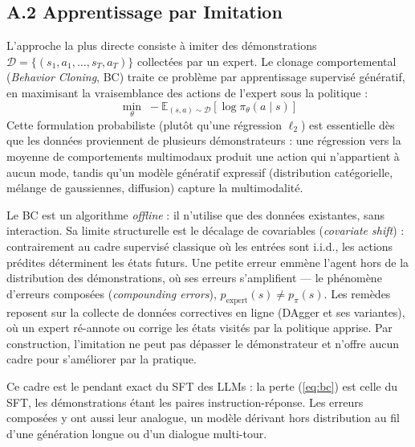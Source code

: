 \documentclass[11pt,a4paper]{article}
\begin{document}
\subsection*{A.2 Apprentissage par Imitation}
L'approche la plus directe consiste à imiter des démonstrations $\mathcal{D} = \{(s_1, a_1, \dots, s_T, a_T)\}$ collectées par un expert. Le clonage comportemental (\emph{Behavior Cloning}, BC) traite ce problème par apprentissage supervisé génératif, en maximisant la vraisemblance des actions de l'expert sous la politique :
\begin{equation}
\min_\theta \; -\mathbb{E}_{(s,a) \sim \mathcal{D}} \left[ \log \pi_\theta(a \mid s) \right]
\label{eq:bc}
\end{equation}
Cette formulation probabiliste (plutôt qu'une régression $\ell_2$) est essentielle dès que les données proviennent de plusieurs démonstrateurs : une régression vers la moyenne de comportements multimodaux produit une action qui n'appartient à aucun mode, tandis qu'un modèle génératif expressif (distribution catégorielle, mélange de gaussiennes, diffusion) capture la multimodalité.

Le BC est un algorithme \emph{offline} : il n'utilise que des données existantes, sans interaction. Sa limite structurelle est le décalage de covariables (\emph{covariate shift}) : contrairement au cadre supervisé classique où les entrées sont i.i.d., les actions prédites déterminent les états futurs. Une petite erreur emmène l'agent hors de la distribution des démonstrations, où ses erreurs s'amplifient — le phénomène d'erreurs composées (\emph{compounding errors}), $p_{\text{expert}}(s) \neq p_\pi(s)$. Les remèdes reposent sur la collecte de données correctives en ligne (DAgger et ses variantes), où un expert ré-annote ou corrige les états visités par la politique apprise. Par construction, l'imitation ne peut pas dépasser le démonstrateur et n'offre aucun cadre pour s'améliorer par la pratique.

Ce cadre est le pendant exact du SFT des LLMs : la perte (\ref{eq:bc}) est celle du SFT, les démonstrations étant les paires instruction-réponse. Les erreurs composées y ont aussi leur analogue, un modèle dérivant hors distribution au fil d'une génération longue ou d'un dialogue multi-tour.

\end{document}
